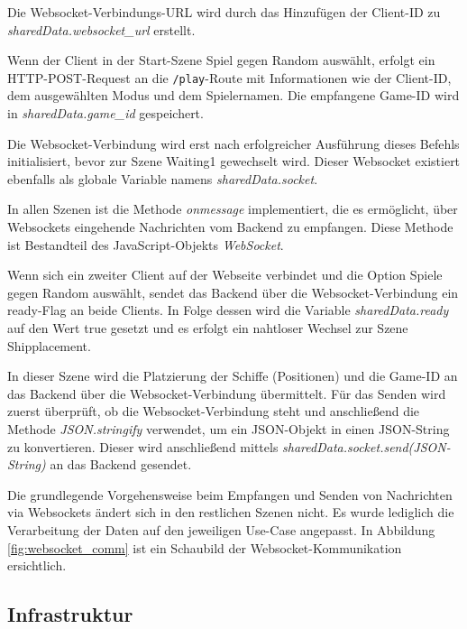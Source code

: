 \documentclass[a4paper, 10pt, conference]{IEEEtran}
\begin{document}
Die Websocket-Verbindungs-URL wird durch das Hinzufügen der Client-ID zu \textit{sharedData.websocket\_url} erstellt.

Wenn der Client in der Start-Szene \glqq Spiel gegen Random\grqq{} auswählt, erfolgt ein HTTP-POST-Request an die \texttt{/play}-Route mit Informationen wie der Client-ID, dem ausgewählten Modus und dem Spielernamen. Die empfangene Game-ID wird in \textit{sharedData.game\_id} gespeichert.

Die Websocket-Verbindung wird erst nach erfolgreicher Ausführung dieses Befehls initialisiert, bevor zur Szene \glqq Waiting1\grqq{} gewechselt wird. Dieser Websocket existiert ebenfalls als globale Variable namens \textit{sharedData.socket}.

In allen Szenen ist die Methode \textit{onmessage} implementiert, die es ermöglicht, über Websockets eingehende Nachrichten vom Backend zu empfangen. Diese Methode ist Bestandteil des JavaScript-Objekts \textit{WebSocket}.

Wenn sich ein zweiter Client auf der Webseite verbindet und die Option \glqq Spiele gegen Random\grqq{} auswählt, sendet das Backend über die Websocket-Verbindung ein \glqq ready\grqq{}-Flag an beide Clients. In Folge dessen wird die Variable \textit{sharedData.ready} auf den Wert \glqq true\grqq{} gesetzt und es erfolgt ein nahtloser Wechsel zur Szene \glqq Shipplacement\grqq{}.

In dieser Szene wird die Platzierung der Schiffe (Positionen) und die Game-ID an das Backend über die Websocket-Verbindung übermittelt. Für das Senden wird zuerst überprüft, ob die Websocket-Verbindung steht und anschließend die Methode \textit{JSON.stringify} verwendet, um ein JSON-Objekt in einen JSON-String zu konvertieren. Dieser wird anschließend mittels \textit{sharedData.socket.send(JSON-String)} an das Backend gesendet.

 Die grundlegende Vorgehensweise beim Empfangen und Senden von Nachrichten via Websockets ändert sich in den restlichen Szenen nicht. Es wurde lediglich die Verarbeitung der Daten auf den jeweiligen Use-Case angepasst. In Abbildung \ref{fig:websocket_comm} ist ein Schaubild der Websocket-Kommunikation ersichtlich.





\subsection{Infrastruktur}\label{subsec:infrastruktur}
\end{document}
